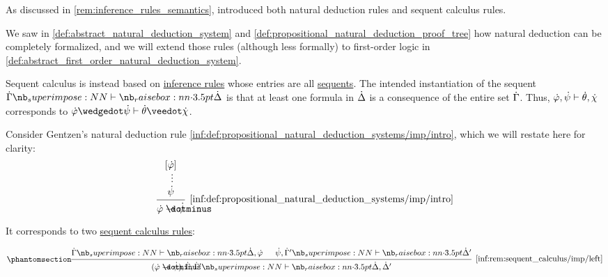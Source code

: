 \begin{remark}\label{rem:sequent_calculus}
  As discussed in \cref{rem:inference_rules_semantics},  introduced both natural deduction rules and sequent calculus rules.

  We saw in \cref{def:abstract_natural_deduction_system} and \cref{def:propositional_natural_deduction_proof_tree} how natural deduction can be completely formalized, and we will extend those rules (although less formally) to first-order logic in \cref{def:abstract_first_order_natural_deduction_system}.

  Sequent calculus is instead based on \hyperref[def:inference_rule]{inference rules} whose entries are all \hyperref[def:sequent]{sequents}. The intended instantiation of the sequent  \( \syn\Gamma \synvdash \syn\Delta \) is that at least one formula in \( \dot{\Delta} \) is a consequence of the entire set \( \dot{\Gamma} \). Thus, \( \dot{\varphi}, \dot{\psi} \vdash \dot{\theta}, \dot{\chi} \) corresponds to \( \syn\varphi \synwedge \syn\psi \vdash \syn\theta \synvee \syn\chi \).

  Consider Gentzen's natural deduction rule \ref{inf:def:propositional_natural_deduction_systems/imp/intro}, which we will restate here for clarity:
  \begin{equation*}
    \begin{prooftree}
      \hypo{ [\syn\varphi] }
      \ellipsis {} { \syn\psi }
      \infer1[\ref{inf:def:propositional_natural_deduction_systems/imp/intro}]{ \syn\varphi \synimplies \syn\psi }
    \end{prooftree}
  \end{equation*}

  It corresponds to two \hyperref[def:abstract_sequent_calculus_system]{sequent calculus rules}:
  \begin{paracol}{2}
    \begin{leftcolumn}
      \ParacolAlignmentHack
      \begin{equation*}\taglabel[\ensuremath{ \rightarrow_L }]{inf:rem:sequent_calculus/imp/left}
        \begin{prooftree}
          \hypo{ \syn\Gamma \synvdash \syn\Delta, \syn\varphi }
          \hypo{ \syn\psi, \syn\Gamma' \synvdash \syn\Delta' }
          \infer2[\ref{inf:rem:sequent_calculus/imp/left}]{ (\syn\varphi \synimplies \syn\psi), \syn\Gamma, \syn\Gamma' \synvdash \syn\Delta, \syn\Delta' }
        \end{prooftree}
      \end{equation*}
    \end{leftcolumn}


\end{paracol}
\end{remark}
